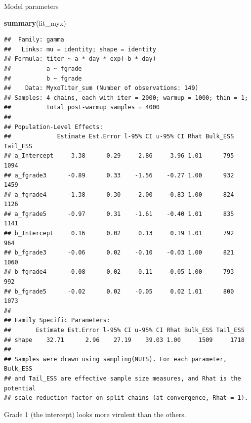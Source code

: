 \documentclass[
  ignorenonframetext,
]{beamer}
\newenvironment{Shaded}{\begin{snugshade}}{\end{snugshade}}
\newcommand{\KeywordTok}[1]{\textcolor[rgb]{0.13,0.29,0.53}{\textbf{#1}}}
\newcommand{\NormalTok}[1]{#1}
\begin{document}
\begin{frame}[fragile]{Model parameters}
\protect\hypertarget{model-parameters}{}

\tiny

\begin{Shaded}
\begin{Highlighting}[]
\KeywordTok{summary}\NormalTok{(fit_myx)}
\end{Highlighting}
\end{Shaded}

\begin{verbatim}
##  Family: gamma 
##   Links: mu = identity; shape = identity 
## Formula: titer ~ a * day * exp(-b * day) 
##          a ~ fgrade
##          b ~ fgrade
##    Data: MyxoTiter_sum (Number of observations: 149) 
## Samples: 4 chains, each with iter = 2000; warmup = 1000; thin = 1;
##          total post-warmup samples = 4000
## 
## Population-Level Effects: 
##             Estimate Est.Error l-95% CI u-95% CI Rhat Bulk_ESS Tail_ESS
## a_Intercept     3.38      0.29     2.86     3.96 1.01      795     1094
## a_fgrade3      -0.89      0.33    -1.56    -0.27 1.00      932     1459
## a_fgrade4      -1.38      0.30    -2.00    -0.83 1.00      824     1126
## a_fgrade5      -0.97      0.31    -1.61    -0.40 1.01      835     1141
## b_Intercept     0.16      0.02     0.13     0.19 1.01      792      964
## b_fgrade3      -0.06      0.02    -0.10    -0.03 1.00      821     1060
## b_fgrade4      -0.08      0.02    -0.11    -0.05 1.00      793      992
## b_fgrade5      -0.02      0.02    -0.05     0.02 1.01      800     1073
## 
## Family Specific Parameters: 
##       Estimate Est.Error l-95% CI u-95% CI Rhat Bulk_ESS Tail_ESS
## shape    32.71      2.96    27.19    39.03 1.00     1509     1718
## 
## Samples were drawn using sampling(NUTS). For each parameter, Bulk_ESS
## and Tail_ESS are effective sample size measures, and Rhat is the potential
## scale reduction factor on split chains (at convergence, Rhat = 1).
\end{verbatim}

\normalsize

Grade 1 (the intercept) looks more virulent than the others.

\end{frame}
\end{document}
